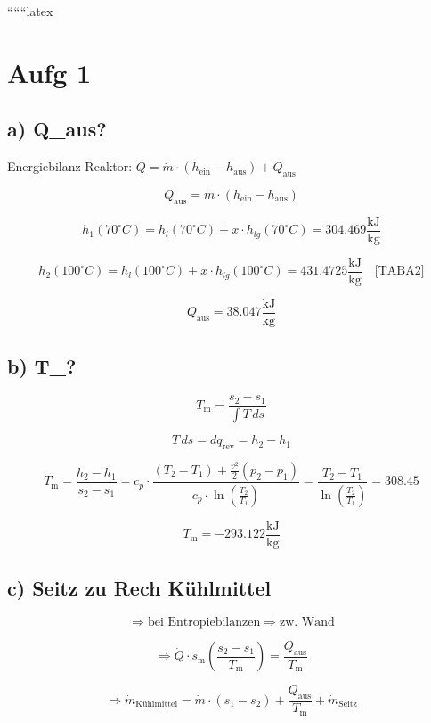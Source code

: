 
``````latex


\section*{Aufg 1}

\subsection*{a) Q\_aus?}

Energiebilanz Reaktor: \( Q = \dot{m} \cdot (h_{\text{ein}} - h_{\text{aus}}) + Q_{\text{aus}} \)

\[
Q_{\text{aus}} = \dot{m} \cdot (h_{\text{ein}} - h_{\text{aus}})
\]

\[
h_1 (70^\circ C) = h_l (70^\circ C) + x \cdot h_{lg} (70^\circ C) = 304.469 \frac{\text{kJ}}{\text{kg}}
\]

\[
h_2 (100^\circ C) = h_l (100^\circ C) + x \cdot h_{lg} (100^\circ C) = 431.4725 \frac{\text{kJ}}{\text{kg}} \quad \text{[TABA2]}
\]

\[
Q_{\text{aus}} = 38.047 \frac{\text{kJ}}{\text{kg}}
\]

\subsection*{b) T_{}?}

\[
T_{\text{m}} = \frac{s_2 - s_1}{\int T \, ds}
\]

\[
T \, ds = dq_{\text{rev}} = h_2 - h_1
\]

\[
T_{\text{m}} = \frac{h_2 - h_1}{s_2 - s_1} = c_p \cdot \frac{(T_2 - T_1) + \frac{v^2}{2} (p_2 - p_1)}{c_p \cdot \ln \left( \frac{T_2}{T_1} \right)} = \frac{T_2 - T_1}{\ln \left( \frac{T_2}{T_1} \right)} = 308.45
\]

\[
T_{\text{m}} = -293.122 \frac{\text{kJ}}{\text{kg}}
\]

\subsection*{c) Seitz zu Rech Kühlmittel}

\[
\Rightarrow \text{bei Entropiebilanzen} \Rightarrow \text{zw. Wand}
\]

\[
\Rightarrow \dot{Q} \cdot s_{\text{m}} \left( \frac{s_2 - s_1}{T_{\text{m}}} \right) = \frac{Q_{\text{aus}}}{T_{\text{m}}}
\]

\[
\Rightarrow \dot{m}_{\text{Kühlmittel}} = \dot{m} \cdot (s_1 - s_2) + \frac{Q_{\text{aus}}}{T_{\text{m}}} + \dot{m}_{\text{Seitz}}
\]

